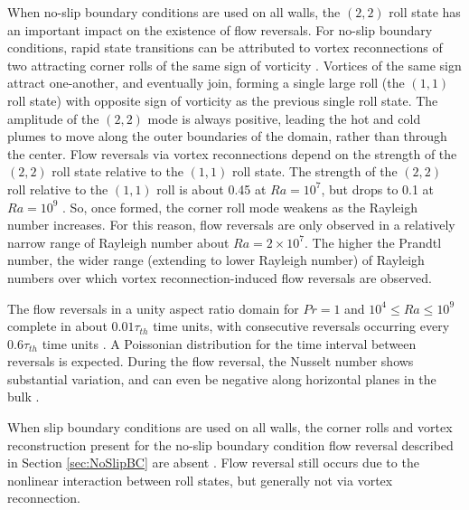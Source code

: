 \documentclass[10pt]{article}
\newcounter{subsubsubsection}[subsubsection]
\numberwithin{equation}{section} %
\begin{document}
When no-slip boundary conditions are used on all walls, the \((2,2)\) roll state has an important impact on the existence of flow reversals. For no-slip boundary conditions, rapid state transitions can be attributed to vortex reconnections of two attracting corner rolls of the same sign of vorticity \cite{chandra}. Vortices of the same sign attract one-another, and eventually join, forming a single large roll (the \((1,1)\) roll state) with opposite sign of vorticity as the previous single roll state. The amplitude of the \((2,2)\) mode is always positive, leading the hot and cold plumes to move along the outer boundaries of the domain, rather than through the center. Flow reversals via vortex reconnections depend on the strength of the \((2,2)\) roll state relative to the \((1,1)\) roll state. The strength of the \((2,2)\) roll relative to the \((1,1)\) roll is about 0.45 at \(Ra=10^7\), but drops to 0.1 at \(Ra=10^9\) \cite{chandra}. So, once formed, the corner roll mode weakens as the Rayleigh number increases. For this reason, flow reversals are only observed in a relatively narrow range of Rayleigh number about \(Ra=2\times10^7\). The higher the Prandtl number, the wider range (extending to lower Rayleigh number) of Rayleigh numbers over which vortex reconnection-induced flow reversals are observed.

The flow reversals in a unity aspect ratio domain for \(Pr=1\) and \(10^4\leq Ra\leq10^9\) complete in about \(0.01\tau_{th}\) time units, with consecutive reversals occurring every \(0.6\tau_{th}\) time units \cite{chandra}. A Poissonian distribution for the time interval between reversals is expected. During the flow reversal, the Nusselt number shows substantial variation, and can even be negative along horizontal planes in the bulk \cite{chandra}.

\label{sec:SlipBC}

When slip boundary conditions are used on all walls, the corner rolls and vortex reconstruction present for the no-slip boundary condition flow reversal described in Section \ref{sec:NoSlipBC} are absent \cite{verma}. Flow reversal still occurs due to the nonlinear interaction between roll states, but generally not via vortex reconnection.
\end{document}
